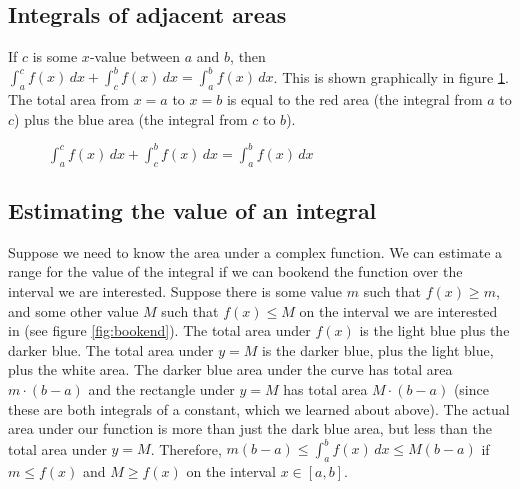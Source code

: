 \subsection{Integrals of adjacent areas}
If $c$ is some $x$-value between $a$ and $b$, then $\int_a^c f(x)\,dx 
+ \int_c^b f(x)\,dx = \int_a^b f(x)\,dx$. This is shown graphically in 
figure \ref{fig:adjacent}. The total area from $x=a$ to $x=b$ is equal 
to the red area (the integral from $a$ to $c$) plus the blue area (the 
integral from $c$ to $b$). 

\begin{figure}[htbp]
	\centering
	\caption{$\int_a^c f(x)\,dx + \int_c^b f(x)\,dx = \int_a^b f(x)\,dx$}
	\label{fig:adjacent}
\end{figure}

\subsection{Estimating the value of an integral}
Suppose we need to know the area under a complex function. We can 
estimate a range for the value of the integral if we can bookend the 
function over the interval we are interested. Suppose there is some 
value $m$ such that $f(x) \geq m$, and some other value $M$ such that 
$f(x) \leq M$ on the interval we are interested in (see figure 
\ref{fig:bookend}). The total area under $f(x)$ is the light blue 
plus the darker blue. The total area under $y=M$ is the darker blue, 
plus the light blue, plus the white area. The darker blue area under 
the curve has total area $m \cdot (b - a)$ and the rectangle under 
$y=M$ has total area $M \cdot (b - a)$ (since these are both integrals 
of a constant, which we learned about above). The actual area under our 
function is more than just the dark blue area, but less than the total 
area under $y=M$. Therefore, $m(b - a) \leq \int_a^b f(x)\,dx \leq 
M(b -a)$ if $m \leq f(x)$ and $M \geq f(x)$ on the interval $x \in 
[a, b]$. 


